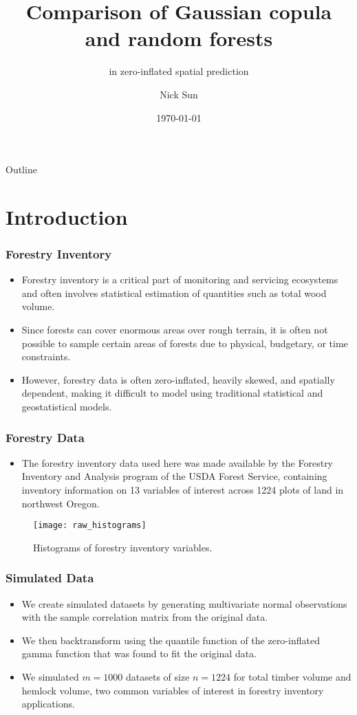 \documentclass{beamer}
\title{Comparison of Gaussian copula and random forests}
\subtitle{in zero-inflated spatial prediction}
\author{Nick Sun}
\institute{Oregon State University, Department of Statistics}
\date{\today}
\begin{document}
\begin{frame}
\titlepage
\end{frame}

\begin{frame}{Outline}
	\tableofcontents
\end{frame}

\section{Introduction}
\begin{frame}
\frametitle{Forestry Inventory}
\begin{itemize}
	\item Forestry inventory is a critical part of monitoring and servicing ecosystems and often involves statistical estimation of quantities such as total wood volume.
	\item Since forests can cover enormous areas over rough terrain, it is often not possible to sample certain areas of forests due to physical, budgetary, or time constraints.
	\item However, forestry data is often zero-inflated, heavily skewed, and spatially dependent, making it difficult to model using traditional statistical and geostatistical models.
\end{itemize}
\end{frame}

\begin{frame}
	\frametitle{Forestry Data}
	\begin{itemize}
		\item  The forestry inventory data used here was made available by the Forestry Inventory and Analysis program of the USDA Forest Service, containing inventory information on 13 variables of interest across 1224 plots of land in northwest Oregon.
	\end{itemize}
	\begin{center}
		\begin{figure}
		\texttt{[image: raw\_histograms]}
		\caption{Histograms of forestry inventory variables.}
		\end{figure}
	\end{center}
\end{frame}

\begin{frame}
	\frametitle{Simulated Data}
	\begin{itemize}
		\item We create simulated datasets by generating multivariate normal observations with the sample correlation matrix from the original data.
		\item We then backtransform using the quantile function of the zero-inflated gamma function that was found to fit the original data.
		\item We simulated $m=1000$ datasets of size $n=1224$ for total timber volume and hemlock volume, two common variables of interest in forestry inventory applications.
	\end{itemize}
\end{frame}
\end{document}

